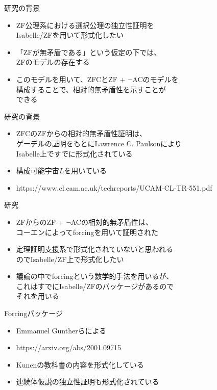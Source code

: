 \documentclass[17pt,aspectratio=169]{beamer}
\begin{document}
\begin{frame} {研究の背景}
    \begin{itemize}
        \item ZF公理系における選択公理の独立性証明を\\Isabelle/ZFを用いて形式化したい
        \item 「ZFが無矛盾である」という仮定の下では、\\ZFのモデルの存在する
        \item このモデルを用いて、ZFCとZF + $\neg$ACのモデルを\\構成することで、相対的無矛盾性を示すことが\\できる
    \end{itemize}
\end{frame}

\begin{frame} {研究の背景}
    \begin{itemize}
        \item ZFCのZFからの相対的無矛盾性証明は、\\
              ゲーデルの証明をもとにLawrence C. Paulsonにより\\
              Isabelle上ですでに形式化されている
        \item 構成可能宇宙$L$を用いている
        \item https://www.cl.cam.ac.uk/techreports/UCAM-CL-TR-551.pdf
    \end{itemize}
\end{frame}

\begin{frame} {研究}
    \begin{itemize}
        \item ZFからのZF + $\neg$ACの相対的無矛盾性は、\\コーエンによってforcingを用いて証明された
        \item 定理証明支援系で形式化されていないと思われる\\のでIsabelle/ZF上で形式化したい
        \item 議論の中でforcingという数学的手法を用いるが、\\これはすでにIsabelle/ZFのパッケージがあるので\\それを用いる
    \end{itemize}
\end{frame}

\begin{frame} {Forcingパッケージ}
    \begin{itemize}
        \item Emmanuel Guntherらによる
        \item https://arxiv.org/abs/2001.09715
        \item Kunenの教科書の内容を形式化している
        \item 連続体仮説の独立性証明も形式化されている
    \end{itemize}
\end{frame}
\end{document}
